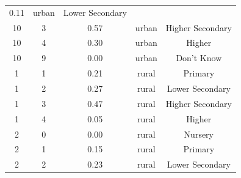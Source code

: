 \documentclass[stu, 12pt, floatsintext,longtable]{apa7}
\begin{document}
\begin{longtable}{ccccc}
    0.11                                               &
    urban                                              & Lower Secondary
    \\
    10                                                 & 3                    &
    0.57                                               &
    urban                                              & Higher Secondary
    \\
    10                                                 & 4                    &
    0.30                                               &
    urban                                              & Higher
    \\
    10                                                 & 9                    &
    0.00                                               &
    urban                                              & Don't Know
    \\
    1                                                  & 1                    &
    0.21                                               &
    rural                                              & Primary
    \\
    1                                                  & 2                    &
    0.27                                               &
    rural                                              & Lower Secondary
    \\
    1                                                  & 3                    &
    0.47                                               &
    rural                                              & Higher Secondary
    \\
    1                                                  & 4                    &
    0.05                                               &
    rural                                              & Higher
    \\
    2                                                  & 0                    &
    0.00                                               &
    rural                                              & Nursery
    \\
    2                                                  & 1                    &
    0.15                                               &
    rural                                              & Primary
    \\
    2                                                  & 2                    &
    0.23                                               &
    rural                                              & Lower Secondary

\end{longtable}
\end{document}

